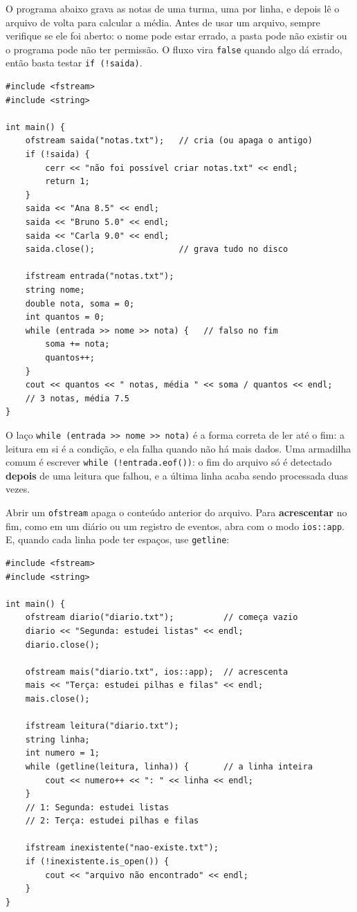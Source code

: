 O programa abaixo grava as notas de uma turma, uma por linha, e depois lê o arquivo de volta para calcular a média. Antes de usar um arquivo, sempre verifique se ele foi aberto: o nome pode estar errado, a pasta pode não existir ou o programa pode não ter permissão. O fluxo vira \texttt{false} quando algo dá errado, então basta testar \texttt{if (!saida)}.

\begin{codigo}
\begin{Verbatim}[breaklines=true, breaksymbolleft={}, fontsize=\footnotesize]
#include <fstream>
#include <string>

int main() {
    ofstream saida("notas.txt");   // cria (ou apaga o antigo)
    if (!saida) {
        cerr << "não foi possível criar notas.txt" << endl;
        return 1;
    }
    saida << "Ana 8.5" << endl;
    saida << "Bruno 5.0" << endl;
    saida << "Carla 9.0" << endl;
    saida.close();                 // grava tudo no disco

    ifstream entrada("notas.txt");
    string nome;
    double nota, soma = 0;
    int quantos = 0;
    while (entrada >> nome >> nota) {   // falso no fim
        soma += nota;
        quantos++;
    }
    cout << quantos << " notas, média " << soma / quantos << endl;
    // 3 notas, média 7.5
}
\end{Verbatim}
\end{codigo}

O laço \texttt{while (entrada >> nome >> nota)} é a forma correta de ler até o fim: a leitura em si é a condição, e ela falha quando não há mais dados. Uma armadilha comum é escrever \texttt{while (!entrada.eof())}: o fim do arquivo só é detectado \textbf{depois} de uma leitura que falhou, e a última linha acaba sendo processada duas vezes.

Abrir um \texttt{ofstream} apaga o conteúdo anterior do arquivo. Para \textbf{acrescentar} no fim, como em um diário ou um registro de eventos, abra com o modo \texttt{ios::app}. E, quando cada linha pode ter espaços, use \texttt{getline}:

\begin{codigo}
\begin{Verbatim}[breaklines=true, breaksymbolleft={}, fontsize=\footnotesize]
#include <fstream>
#include <string>

int main() {
    ofstream diario("diario.txt");          // começa vazio
    diario << "Segunda: estudei listas" << endl;
    diario.close();

    ofstream mais("diario.txt", ios::app);  // acrescenta
    mais << "Terça: estudei pilhas e filas" << endl;
    mais.close();

    ifstream leitura("diario.txt");
    string linha;
    int numero = 1;
    while (getline(leitura, linha)) {       // a linha inteira
        cout << numero++ << ": " << linha << endl;
    }
    // 1: Segunda: estudei listas
    // 2: Terça: estudei pilhas e filas

    ifstream inexistente("nao-existe.txt");
    if (!inexistente.is_open()) {
        cout << "arquivo não encontrado" << endl;
    }
}
\end{Verbatim}
\end{codigo}


